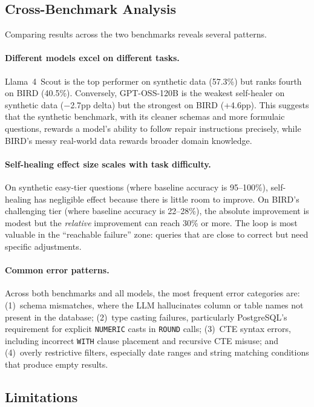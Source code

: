 \documentclass{article}
\begin{document}
\subsection{Cross-Benchmark Analysis}

Comparing results across the two benchmarks reveals several patterns.

\paragraph{Different models excel on different tasks.} Llama~4~Scout is the top performer on synthetic data (57.3\%) but ranks fourth on BIRD (40.5\%). Conversely, GPT-OSS-120B is the weakest self-healer on synthetic data ($-$2.7pp delta) but the strongest on BIRD (+4.6pp). This suggests that the synthetic benchmark, with its cleaner schemas and more formulaic questions, rewards a model's ability to follow repair instructions precisely, while BIRD's messy real-world data rewards broader domain knowledge.

\paragraph{Self-healing effect size scales with task difficulty.} On synthetic easy-tier questions (where baseline accuracy is 95--100\%), self-healing has negligible effect because there is little room to improve. On BIRD's challenging tier (where baseline accuracy is 22--28\%), the absolute improvement is modest but the \emph{relative} improvement can reach 30\% or more. The loop is most valuable in the ``reachable failure'' zone: queries that are close to correct but need specific adjustments.

\paragraph{Common error patterns.} Across both benchmarks and all models, the most frequent error categories are: (1)~schema mismatches, where the LLM hallucinates column or table names not present in the database; (2)~type casting failures, particularly PostgreSQL's requirement for explicit \texttt{NUMERIC} casts in \texttt{ROUND} calls; (3)~CTE syntax errors, including incorrect \texttt{WITH} clause placement and recursive CTE misuse; and (4)~overly restrictive filters, especially date ranges and string matching conditions that produce empty results.


\subsection{Limitations}
\end{document}
